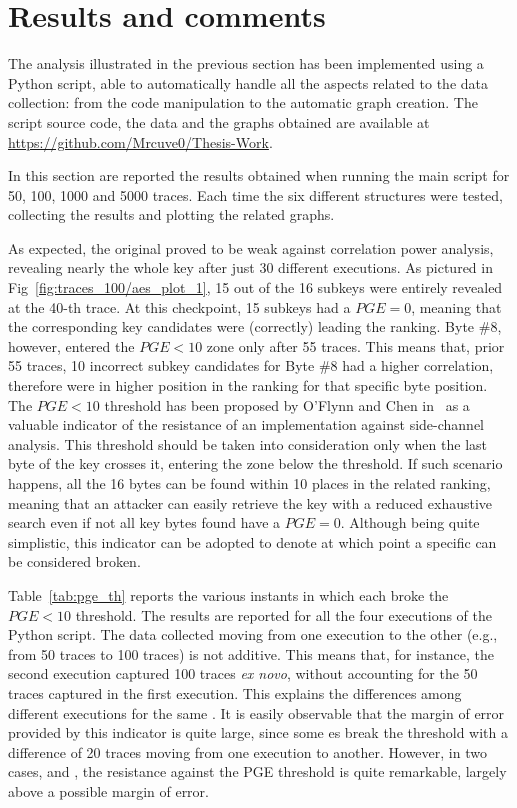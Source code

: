     \section{Results and comments}

        The analysis illustrated in the previous section has been implemented using a Python script, able to automatically handle all the aspects related to the data collection: from the \sbocs{} code manipulation to the automatic graph creation. The script source code, the data and the graphs obtained are available at \url{https://github.com/Mrcuve0/Thesis-Work}.
        
        In this section are reported the results obtained when running the main script for 50, 100, 1000 and 5000 traces. Each time the six different \sbocs{} structures were tested, collecting the results and plotting the related graphs.
        
        As expected, the original \aes{} \sbocs{} proved to be weak against correlation power analysis, revealing nearly the whole key after just 30 different executions. As pictured in Fig~\ref{fig:traces_100/aes_plot_1}, 15 out of the 16 subkeys were entirely revealed at the 40-th trace. At this checkpoint, 15 subkeys had a $PGE = 0$, meaning that the corresponding key candidates were (correctly) leading the ranking. Byte $\#8$, however, entered the $PGE < 10$ zone only after 55 traces. This means that, prior 55 traces, 10 incorrect subkey candidates for Byte $\#8$ had a higher correlation, therefore were in higher position in the ranking for that specific byte position. The $PGE < 10$ threshold has been proposed by O'Flynn and Chen in~\cite{o2015synchronous} as a valuable indicator of the resistance of an implementation against side-channel analysis. This threshold should be taken into consideration only when the last byte of the key crosses it, entering the zone below the threshold. If such scenario happens, all the 16 bytes can be found within 10 places in the related ranking, meaning that an attacker can easily retrieve the key with a reduced exhaustive search even if not all key bytes found have a $PGE = 0$. Although being quite simplistic, this indicator can be adopted to denote at which point a specific \sbocs{} can be considered broken.

        Table~\ref{tab:pge_th} reports the various instants in which each \sbocs{} broke the $PGE < 10$ threshold. The results are reported for all the four executions of the Python script. The data collected moving from one execution to the other (e.g., from 50 traces to 100 traces) is not additive. This means that, for instance, the second execution captured 100 traces \emph{ex novo}, without accounting for the 50 traces captured in the first execution. This explains the differences among different executions for the same \sbocs{}. It is easily observable that the margin of error provided by this indicator is quite large, since some \sbocs{}es break the threshold with a difference of 20 traces moving from one execution to another. However, in two cases, \xfone{} and \xftwo{}, the resistance against the PGE threshold is quite remarkable, largely above a possible margin of error.

